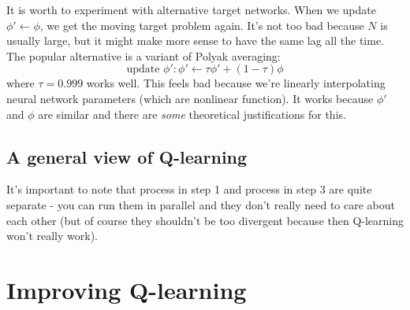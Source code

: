 \documentclass{report}
\begin{document}
It is worth to experiment with alternative target networks.
When we update $\phi' \leftarrow \phi$, we get the moving target problem again.
It's not too bad because $N$ is usually large, but it might make
more sense to have the same lag all the time.
The popular alternative is a variant of Polyak averaging:
\begin{equation}
		\text{update } \phi' : \phi' \leftarrow \tau \phi' + (1 - \tau) \phi
\end{equation}
where $\tau = 0.999$ works well.
This feels bad because we're linearly interpolating neural network parameters (which are nonlinear function).
It works because $\phi'$ and $\phi$ are similar and there are \textit{some} theoretical justifications for this.

\section{A general view of Q-learning}

It's important to note that process in step 1 and process in step 3 are quite separate - you can run them in parallel and they
don't really need to care about each other (but of course they shouldn't be too divergent because then Q-learning won't really work).

\chapter{Improving Q-learning}
\end{document}
